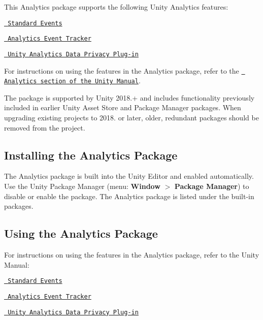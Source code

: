 This Analytics package supports the following Unity Analytics features\+:


\begin{DoxyItemize}
\item \href{https://docs.unity3d.com/Manual/UnityAnalyticsStandardEvents.html}{\texttt{ Standard Events}}
\item \href{https://docs.unity3d.com/Manual/class-AnalyticsEventTracker.html}{\texttt{ Analytics Event Tracker}}
\item \href{https://docs.unity3d.com/Manual/UnityAnalyticsDataPrivacy.html}{\texttt{ Unity Analytics Data Privacy Plug-\/in}}
\end{DoxyItemize}

For instructions on using the features in the Analytics package, refer to the \href{https://docs.unity3d.com/Manual/UnityAnalytics.html}{\texttt{ Analytics section of the Unity Manual}}.

The package is supported by Unity 2018.+ and includes functionality previously included in earlier Unity Asset Store and Package Manager packages. When upgrading existing projects to 2018. or later, older, redundant packages should be removed from the project.

\subsection*{Installing the Analytics Package}

The Analytics package is built into the Unity Editor and enabled automatically. Use the Unity Package Manager (menu\+: {\bfseries{Window}} $>$ {\bfseries{Package Manager}}) to disable or enable the package. The Analytics package is listed under the built-\/in packages.

\label{_UsingAnalytics}%
 \subsection*{Using the Analytics Package}

For instructions on using the features in the Analytics package, refer to the Unity Manual\+:


\begin{DoxyItemize}
\item \href{https://docs.unity3d.com/Manual/UnityAnalyticsStandardEvents.html}{\texttt{ Standard Events}}
\item \href{https://docs.unity3d.com/Manual/class-AnalyticsEventTracker.html}{\texttt{ Analytics Event Tracker}}
\item \href{https://docs.unity3d.com/Manual/UnityAnalyticsDataPrivacy.html}{\texttt{ Unity Analytics Data Privacy Plug-\/in}}
\end{DoxyItemize}

